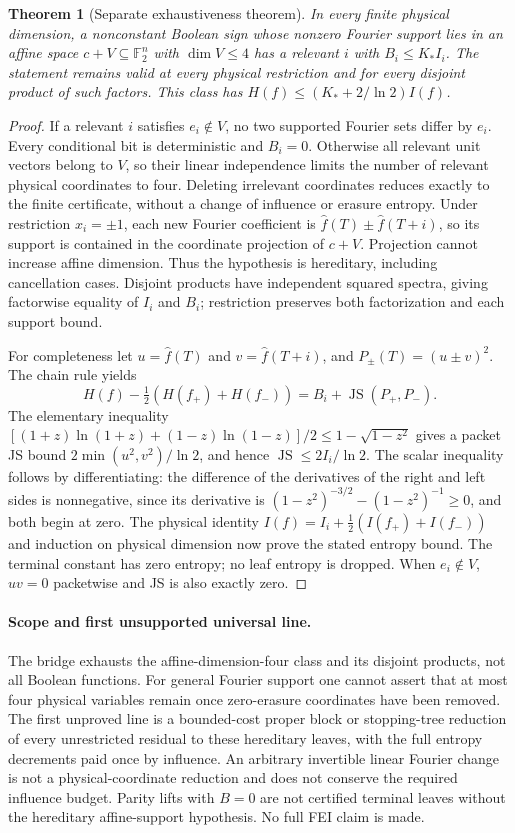 \documentclass{article}
\newtheorem{theorem}{Theorem}
\begin{document}
\begin{theorem}[Separate exhaustiveness theorem]
In every finite physical dimension, a nonconstant Boolean sign whose nonzero
Fourier support lies in an affine space $c+V\subseteq\mathbb F_2^n$ with
$\dim V\le4$ has a relevant $i$ with $B_i\le K_* I_i$.
The statement remains valid at every physical restriction and for every disjoint
product of such factors. This class has $H(f)\le(K_*+2/\ln2)I(f)$.
\end{theorem}
\begin{proof}
If a relevant $i$ satisfies $e_i\notin V$, no two supported Fourier sets
differ by $e_i$. Every conditional bit is deterministic and $B_i=0$.
Otherwise all relevant unit vectors belong to $V$, so their linear independence
limits the number of relevant physical coordinates to four. Deleting irrelevant
coordinates reduces exactly to the finite certificate, without a change of
influence or erasure entropy. Under restriction $x_i=\pm1$, each new Fourier
coefficient is $\widehat f(T)\pm\widehat f(T+i)$, so its support is contained
in the coordinate projection of $c+V$. Projection cannot increase affine
dimension. Thus the hypothesis is hereditary, including cancellation cases.
Disjoint products have independent squared spectra, giving factorwise equality
of $I_i$ and $B_i$; restriction preserves both factorization and each support bound.

For completeness let $u=\widehat f(T)$ and $v=\widehat f(T+i)$, and
$P_\pm(T)=(u\pm v)^2$. The chain rule yields
\[
 H(f)-\tfrac12(H(f_+)+H(f_-))=B_i+\operatorname{JS}(P_+,P_-).
\]
The elementary inequality
$[(1+z)\ln(1+z)+(1-z)\ln(1-z)]/2\le1-\sqrt{1-z^2}$
gives a packet JS bound $2\min(u^2,v^2)/\ln2$, and hence
$\operatorname{JS}\le2I_i/\ln2$.
The scalar inequality follows by differentiating: the difference of the
derivatives of the right and left sides is nonnegative, since its derivative
is $(1-z^2)^{-3/2}-(1-z^2)^{-1}\ge0$, and both begin at zero.
The physical identity
$I(f)=I_i+\tfrac12(I(f_+)+I(f_-))$ and induction on physical dimension
now prove the stated entropy bound. The terminal constant has zero entropy;
no leaf entropy is dropped. When $e_i\notin V$, $uv=0$ packetwise and JS is
also exactly zero.
\end{proof}

\paragraph{Scope and first unsupported universal line.}
The bridge exhausts the affine-dimension-four class and its disjoint products,
not all Boolean functions. For general Fourier support one cannot assert that
at most four physical variables remain once zero-erasure coordinates have been
removed. The first unproved line is a bounded-cost proper block or stopping-tree
reduction of every unrestricted residual to these hereditary leaves, with the
full entropy decrements paid once by influence. An arbitrary invertible linear
Fourier change is not a physical-coordinate reduction and does not conserve
the required influence budget. Parity lifts with $B=0$ are not certified terminal
leaves without the hereditary affine-support hypothesis. No full FEI claim is made.
\end{document}
